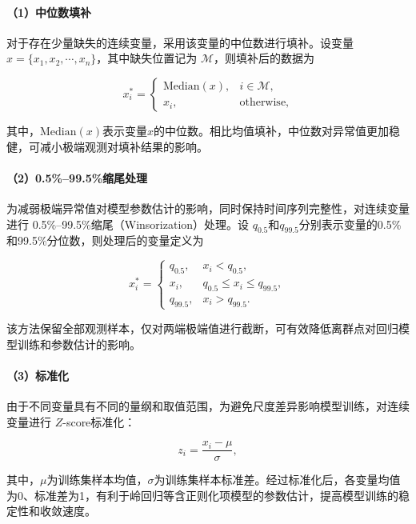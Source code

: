 \documentclass[UTF8,12pt,a4paper]{ctexart}
\begin{document}
\paragraph{（1）中位数填补}

对于存在少量缺失的连续变量，采用该变量的中位数进行填补。设变量
$x=\{x_1,x_2,\cdots,x_n\}$，其中缺失位置记为
$\mathcal{M}$，则填补后的数据为

\begin{equation}
x_i^*=
\begin{cases}
\mathrm{Median}(x), & i\in\mathcal{M},\\
x_i, & \text{otherwise},
\end{cases} 
\end{equation}

其中，$\mathrm{Median}(x)$表示变量$x$的中位数。相比均值填补，中位数对异常值更加稳健，可减小极端观测对填补结果的影响。

\paragraph{（2）0.5\%--99.5\%缩尾处理}

为减弱极端异常值对模型参数估计的影响，同时保持时间序列完整性，对连续变量进行
0.5\%--99.5\%缩尾（Winsorization）处理。设
$q_{0.5}$和$q_{99.5}$分别表示变量的0.5\%和99.5\%分位数，则处理后的变量定义为

\begin{equation}
x_i^*=
\begin{cases}
q_{0.5}, & x_i<q_{0.5},\\
x_i, & q_{0.5}\le x_i\le q_{99.5},\\
q_{99.5}, & x_i>q_{99.5}.
\end{cases}
\end{equation}

该方法保留全部观测样本，仅对两端极端值进行截断，可有效降低离群点对回归模型训练和参数估计的影响。

\paragraph{（3）标准化}

由于不同变量具有不同的量纲和取值范围，为避免尺度差异影响模型训练，对连续变量进行
$Z$-score标准化：

\begin{equation}
z_i=\frac{x_i-\mu}{\sigma},
\end{equation}

其中，$\mu$为训练集样本均值，$\sigma$为训练集样本标准差。经过标准化后，各变量均值为0、标准差为1，有利于岭回归等含正则化项模型的参数估计，提高模型训练的稳定性和收敛速度。
\end{document}

